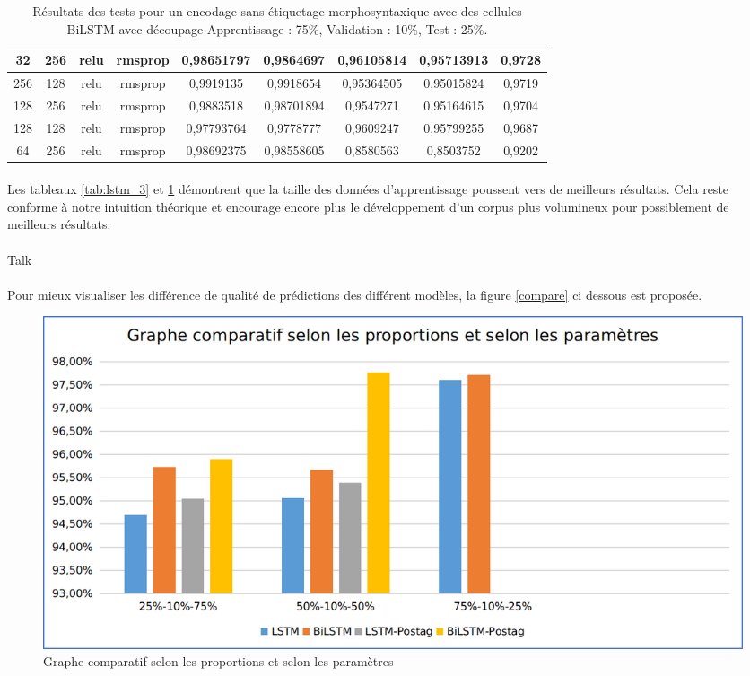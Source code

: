 \begin{table}[H]
{\begin{tabular}{|c|c|c|c|c|c|c|c|c|}
				32 & 256 & relu & rmsprop & 0,98651797 & 0,9864697 & 0,96105814 & 0,95713913 & 0,9728 \\ \hline
				256 & 128 & relu & rmsprop & 0,9919135 & 0,9918654 & 0,95364505 & 0,95015824 & 0,9719 \\ \hline
				128 & 256 & relu & rmsprop & 0,9883518 & 0,98701894 & 0,9547271 & 0,95164615 & 0,9704 \\ \hline
				128 & 128 & relu & rmsprop & 0,97793764 & 0,9778777 & 0,9609247 & 0,95799255 & 0,9687 \\ \hline
				64 & 256 & relu & rmsprop & 0,98692375 & 0,98558605 & 0,8580563 & 0,8503752 & 0,9202 \\ \hline
			\end{tabular}%
		}
		\caption{Résultats des tests pour un encodage sans étiquetage morphosyntaxique avec des cellules BiLSTM avec découpage Apprentissage : 75\%, Validation : 10\%, Test : 25\%.}
		\label{tab:bilstm_3}
	\end{table}
	\paragraph{}
	Les tableaux \ref{tab:lstm_3} et \ref{tab:bilstm_3} démontrent que la taille des données d'apprentissage poussent vers de meilleurs résultats. Cela reste conforme à notre intuition théorique et encourage encore plus le développement d'un corpus plus volumineux pour possiblement de meilleurs résultats.
	
	
	
	\paragraph{}
	Talk
	\paragraph{}
	Pour mieux visualiser les différence de qualité de prédictions des différent modèles, la figure \ref{compare} ci dessous est proposée.
	
	\begin{figure}[H]
		\centering
		\includegraphics[width=.9\linewidth]{images/implementation/graphs.png} 
		\caption{Graphe comparatif selon les proportions et selon les paramètres} 
	\end{figure}
	
